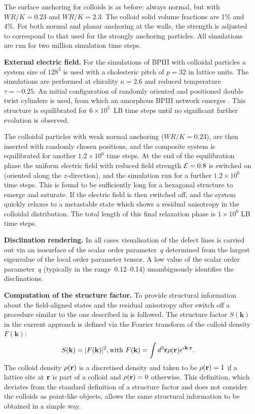 \documentclass[12pt,twoside]{article}
\begin{document}
The surface anchoring for colloids is as before: always normal, but with
$WR/K = 0.23$ and $WR/K = 2.3$. The colloid solid volume fractions are
1\% and 4\%.
For both normal and planar anchoring at the walls,
the strength is adjusted to correspond to that used for the strongly
anchoring particles.
All simulations are run for two million simulation time steps.

\noindent
\textbf{External electric field.}
For the simulations of BPIII with colloidal particles a system size of
$128^3$ is used with a cholesteric pitch of $p=32$ in lattice units. 
The simulations are
performed at chirality $\kappa=2.6$ and reduced temperature $\tau=-0.25$.  
An initial configuration of
randomly oriented and positioned double twist cylinders is used,
from which an amorphous BPIII network emerges \cite{oliver-bp3}. This structure
is equilibrated for $6\times10^{5}$~LB time steps until no significant
further evolution is observed. 

The colloidal particles with weak
normal anchoring ($WR / K= 0.23$), are then inserted with randomly chosen positions,
and the composite system is equilibrated for another $1.2\times10^{6}$
time steps.
At the end of the equilibration phase the uniform electric field
with reduced field strength ${\cal E} = 0.8$ 
is switched on (oriented along the $z$-direction), and the simulation
run for a further $1.2\times10^{6}$ time steps.
This is found to be sufficiently long for a hexagonal structure to
emerge and saturate.
If the electric field is then switched off, and the system quickly relaxes
to a metastable state which shows a residual anisotropy in the
colloidal distribution. The total length of this final relaxation phase
is $1\times10^6$ LB time steps.

\noindent
\textbf{Disclination rendering.}
In all cases visualisation of the defect lines is carried out via
an isosurface of the scalar order parameter~$q$ determined from the
largest eigenvalue of the local order parameter tensor. A low value
of the scalar order parameter~$q$ (typically in the range~0.12--0.14)
unambiguously identifies the disclinations.

\noindent
\textbf{Computation of the structure factor.}
To provide structural information about the field-aligned 
states and the residual anisotropy after switch off a 
procedure similar to the one described in \cite{oliver-bp3} is
followed.
The structure factor $S(\mathbf{k})$ in the current approach is
defined via the Fourier transform of the colloid density $F(\mathbf{k})$:
\begin{equation}
S({\bf k}) =  |F({\bf k})|^2, \mathrm{with}\
F({\bf k}) = \int d^3{\bf r} \rho({\bf r}) e^{i {\bf k. r}}.
\end{equation}
The colloid density $\rho({\bf r})$ is a discretised density and taken to be
$\rho({\bf r})=1$ if a lattice site at ${\bf r}$ is part of a colloid
and $\rho({\bf r})=0$ otherwise. This definition, which deviates from the 
standard definition of a structure factor and does not consider the colloids 
as point-like objects, allows the same structural information
to be obtained in a simple way.
\end{document}
